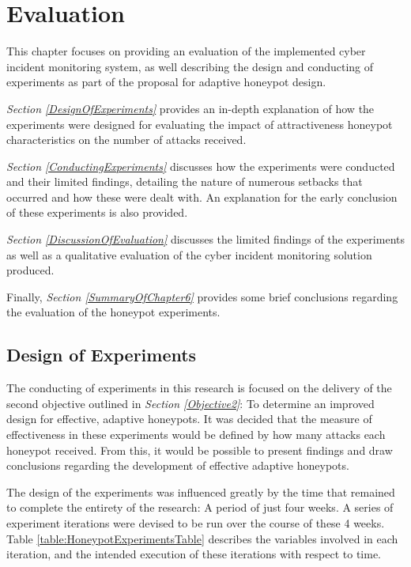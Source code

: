 

\chapter{Evaluation} \label{Chapter6}

This chapter focuses on providing an evaluation of the implemented cyber incident monitoring system, as well describing the design and conducting of experiments as part of the proposal for adaptive honeypot design.

\textit{Section \ref{DesignOfExperiments}} provides an in-depth explanation of how the experiments were designed for evaluating the impact of attractiveness honeypot characteristics on the number of attacks received.

\textit{Section \ref{ConductingExperiments}} discusses how the experiments were conducted and their limited findings, detailing the nature of numerous setbacks that occurred and how these were dealt with. An explanation for the early conclusion of these experiments is also provided.

\textit{Section \ref{DiscussionOfEvaluation}} discusses the limited findings of the experiments as well as a qualitative evaluation of the cyber incident monitoring solution produced.

Finally, \textit{Section \ref{SummaryOfChapter6}} provides some brief conclusions regarding the evaluation of the honeypot experiments.

\section{Design of Experiments \label{DesignOfExperiments}}
The conducting of experiments in this research is focused on the delivery of the second objective outlined in \textit{Section \ref{Objective2}}: To determine an improved design for effective, adaptive honeypots. It was decided that the measure of effectiveness in these experiments would be defined by how many attacks each honeypot received. From this, it would be possible to present findings and draw conclusions regarding the development of effective adaptive honeypots. 

The design of the experiments was influenced greatly by the time that remained to complete the entirety of the research: A period of just four weeks. A series of experiment iterations were devised to be run over the course of these 4 weeks. Table \ref{table:HoneypotExperimentsTable} describes the variables involved in each iteration, and the intended execution of these iterations with respect to time. 


